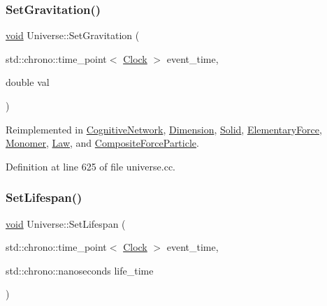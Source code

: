 \subsubsection{\texorpdfstring{Set\+Gravitation()}{SetGravitation()}}
{\footnotesize\ttfamily \mbox{\hyperlink{glad_8h_a950fc91edb4504f62f1c577bf4727c29}{void}} Universe\+::\+Set\+Gravitation (\begin{DoxyParamCaption}\item[{std\+::chrono\+::time\+\_\+point$<$ \mbox{\hyperlink{universe_8h_a0ef8d951d1ca5ab3cfaf7ab4c7a6fd80}{Clock}} $>$}]{event\+\_\+time,  }\item[{double}]{val }\end{DoxyParamCaption})\hspace{0.3cm}{\ttfamily [virtual]}}



Reimplemented in \mbox{\hyperlink{class_cognitive_network_af9f082a70f0cc25a3f818d9eace5a527}{Cognitive\+Network}}, \mbox{\hyperlink{class_dimension_aeec6887382d09e3d78382582ff4e7c33}{Dimension}}, \mbox{\hyperlink{class_solid_ae237f2c713868c133e28ed7f75fc9125}{Solid}}, \mbox{\hyperlink{class_elementary_force_aa36d5875964f7e2fc981f6fc5431be7f}{Elementary\+Force}}, \mbox{\hyperlink{class_monomer_ab38d44b27a46d5630aeb5e889f927c09}{Monomer}}, \mbox{\hyperlink{class_law_a908ccc2b0a561a7324a15393ec157219}{Law}}, and \mbox{\hyperlink{class_composite_force_particle_ad9e1553ab0096230edd591e3135b223d}{Composite\+Force\+Particle}}.



Definition at line 625 of file universe.\+cc.

\mbox{\label{class_universe_ac3443dd59b61ae3110f07f681f63ed0a}} 
\subsubsection{\texorpdfstring{Set\+Lifespan()}{SetLifespan()}}
{\footnotesize\ttfamily \mbox{\hyperlink{glad_8h_a950fc91edb4504f62f1c577bf4727c29}{void}} Universe\+::\+Set\+Lifespan (\begin{DoxyParamCaption}\item[{std\+::chrono\+::time\+\_\+point$<$ \mbox{\hyperlink{universe_8h_a0ef8d951d1ca5ab3cfaf7ab4c7a6fd80}{Clock}} $>$}]{event\+\_\+time,  }\item[{std\+::chrono\+::nanoseconds}]{life\+\_\+time }\end{DoxyParamCaption})}



